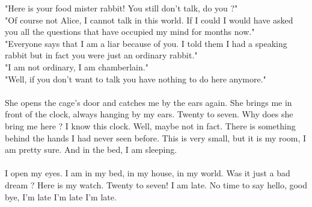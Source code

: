 \documentclass[a4paper]{article}
\begin{document}
"Here is your food mister rabbit!  You still don't talk, do you ?"\\
"Of course not Alice, I cannot talk in this world. If I could I would have asked you all the questions that have occupied my mind for months now."\\
"Everyone says that I am a liar because of you. I told them I had a speaking rabbit but in fact you were just an ordinary rabbit."\\
"I am not ordinary, I am chamberlain."\\
"Well, if you don't want to talk you have nothing to do here anymore."\\
\\
She opens the cage's door and catches me by the ears again. She brings me in front of the clock, always hanging by my ears. Twenty to seven. Why does she bring me here ? I know this clock. Well, maybe not in fact. There is something behind the hands I had never seen before. This is very small, but it is my room, I am pretty sure. And in the bed, I am sleeping.\\
\\
I open my eyes. I am in my bed, in my house, in my world. Was it just a bad dream ? Here is my watch. Twenty to seven! I am late. No time to say hello, good bye, I'm late I'm late I'm late.
\end{document}
